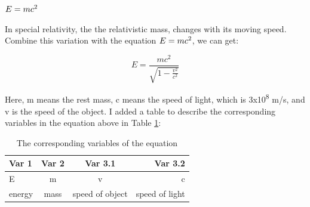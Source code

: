 \documentclass[12pt, letterpaper]{article} %
\begin{document}
\begin{math}  %
  E = {mc}\textsuperscript{2} %
\end{math} %

In special relativity, the the relativistic mass, changes with its moving speed. 
Combine this variation with the equation $E = mc\textsuperscript{2}$, we can get: 

\begin{equation} 
  E = \frac{mc^2}{\sqrt{1-\frac{v^2}{c^2}}}
  \label{eq:1}  
\end{equation} %

Here, m means the rest mass, c means the speed of light, which is 3x10\textsuperscript{8} m/s, and v is the speed 
of the object. I added a table to describe the corresponding variables in the equation above in 
Table \ref{tab:tab1}: %

\begin{table}[!h] %
  \begin{center} %
  \begin{tabular}{|l|c|c|r|} %
    \hline %
    Var 1 & Var 2 & Var 3.1 & Var 3.2\\ %
    \hline %
    \hline %
    E & m &v & c\\ %
    \hline %
    \hline %
    energy & mass& speed of object & speed of light \\ %
    \hline %
  \end{tabular} %
  \caption{The corresponding variables of the equation } %
  \label{tab:tab1} %
  \end{center} %
\end{table} %
\end{document}
